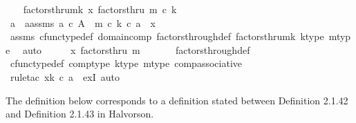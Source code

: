 \begin{isabellebody}
\ \ \isamarkupfalse%
\ factorsthru{\isacharunderscore}{\kern0pt}mk{\isacharcolon}{\kern0pt}\ {\isachardoublequoteopen}x\ factorsthru\ {\isacharparenleft}{\kern0pt}m\ {\isasymcirc}\isactrlsub c\ k{\isacharparenright}{\kern0pt}{\isachardoublequoteclose}\isanewline
\ \ \isanewline
\ \ \isamarkupfalse%
\ a\ \ a{\isacharunderscore}{\kern0pt}assms{\isacharcolon}{\kern0pt}\ {\isachardoublequoteopen}a\ {\isasymin}\isactrlsub c\ A\ {\isasymand}\ {\isacharparenleft}{\kern0pt}m\ {\isasymcirc}\isactrlsub c\ k{\isacharparenright}{\kern0pt}\ {\isasymcirc}\isactrlsub c\ a\ {\isacharequal}{\kern0pt}\ x{\isachardoublequoteclose}\isanewline
\ \ \ \ \isamarkupfalse%
\ assms{\isacharparenleft}{\kern0pt}{}{\isacharparenright}{\kern0pt}\ cfunc{\isacharunderscore}{\kern0pt}type{\isacharunderscore}{\kern0pt}def\ domain{\isacharunderscore}{\kern0pt}comp\ factors{\isacharunderscore}{\kern0pt}through{\isacharunderscore}{\kern0pt}def\ factorsthru{\isacharunderscore}{\kern0pt}mk\ k{\isacharunderscore}{\kern0pt}type\ m{\isacharunderscore}{\kern0pt}type\ \isamarkupfalse%
\ auto\isanewline
\ \ \isamarkupfalse%
\ \isamarkupfalse%
\ {\isachardoublequoteopen}x\ factorsthru\ m\ {\isachardoublequoteclose}\isanewline
\ \ \ \ \isamarkupfalse%
\ factors{\isacharunderscore}{\kern0pt}through{\isacharunderscore}{\kern0pt}def\ \isanewline
\ \ \ \ \isamarkupfalse%
\ cfunc{\isacharunderscore}{\kern0pt}type{\isacharunderscore}{\kern0pt}def\ comp{\isacharunderscore}{\kern0pt}type\ k{\isacharunderscore}{\kern0pt}type\ m{\isacharunderscore}{\kern0pt}type\ comp{\isacharunderscore}{\kern0pt}associative\isanewline
\ \ \ \ \isamarkupfalse%
\ {\isacharparenleft}{\kern0pt}rule{\isacharunderscore}{\kern0pt}tac\ x{\isacharequal}{\kern0pt}{\isachardoublequoteopen}k\ {\isasymcirc}\isactrlsub c\ a{\isachardoublequoteclose}\ \ exI{\isacharcomma}{\kern0pt}\ auto{\isacharparenright}{\kern0pt}\isanewline
{}\isamarkupfalse%
%
\endisatagproof
{\isafoldproof}%
%
\isadelimproof
%
\endisadelimproof
%
\isadelimdocument
%
\endisadelimdocument
%
\isatagdocument
%
\isamarkuptrue%
%
\endisatagdocument
{\isafolddocument}%
%
\isadelimdocument
%
\endisadelimdocument
%
\begin{isamarkuptext}%
The definition below corresponds to a definition stated between Definition 2.1.42 and Definition 2.1.43 in Halvorson.%
\end{isamarkuptext}\isamarkuptrue%

\end{isabellebody}
